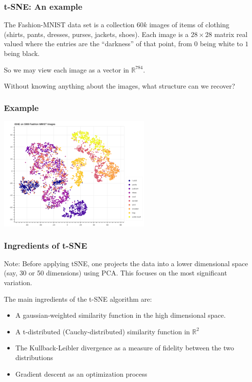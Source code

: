 \documentclass{beamer}
\newcommand{\R}{\mathbb{R}}
\begin{document}
\begin{frame}
  \frametitle{t-SNE: An example}
\begin{block}{}
  The Fashion-MNIST data set is a collection $60k$ images of items of clothing (shirts, pants, dresses, purses, jackets, shoes).  Each image is
  a $28\times 28$ matrix real valued where the entries are the ``darkness'' of that point, from $0$ being white to $1$ being black.
\end{block}
\begin{block}{}
So we may view each image as a vector in $\R^{784}$.
\end{block}
\begin{block}{}
  Without knowing anything about the images, what structure can we recover?
\end{block}
\end{frame}
\begin{frame}
  \frametitle{Example}
  \begin{center}
    \href{http://tsne-fashion.herokuapp.com}{\includegraphics[width=3in]{tsne_fashion.png}}
  \end{center}
\end{frame}
\begin{frame}
  \frametitle{Ingredients of t-SNE}
  Note: Before applying tSNE, one projects the data into a lower dimensional space (say, 30 or 50 dimensions) using PCA. This focuses on the most significant
  variation.
  \bigskip\noindent
  
  The main ingredients of the t-SNE algorithm are:
  \begin{itemize}
  \item A gaussian-weighted similarity function in the high dimensional space.
  \item A t-distributed (Cauchy-distributed) similarity function in $\R^{2}$
  \item The Kullback-Leibler divergence as a measure of fidelity between the two distributions
  \item Gradient descent as an optimization process
  \end{itemize}
\end{frame}
\end{document}
